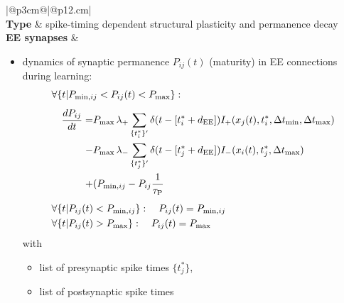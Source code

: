 \documentclass[10pt,a4paper,twoside,american]{article}
\newcommand{\EE}{{\exc\exc}}
\newcommand{\exc}{\textnormal{E}}     %
\begin{document}
\begin{table}[ht!]
  \small
  \begin{tabular}{|@{\hspace*{1mm}}p{3cm}@{}|@{\hspace*{1mm}}p{}|}
  \hline 
  \\
  \hline
  \textbf{Type} & spike-timing dependent structural plasticity and permanence decay \\
  \hline
  \textbf{EE synapses} &
      \begin{itemize}  
        \item dynamics of synaptic permanence $P_{ij}(t)$ (maturity) in EE connections during learning:
          \begin{equation}
            \label{eq:plasticity}
            \begin{aligned}
              &\forall \{t|P_{\text{min},ij}<P_{ij}(t)<P_\text{max}\}: \\[1ex]
              &\begin{aligned}
                \quad \frac{dP_{ij}}{dt} = &P_\text{max} \, \lambda_{+} \sum_{\{t_i^*\}^\prime} \delta(t-[t_i^*+d_\EE]) I_{+}(x_j(t), t_i^*,\Delta{}t_\text{min},\Delta{}t_\text{max}) \\
                - &P_\text{max} \, \lambda_{-} \sum_{\{t_j^*\}^\prime} \delta(t-[t_j^*+d_\EE]) I_{-}(x_i(t),t_j^*,\Delta{}t_\text{max}) \\
                + &(P_{\text{min},ij}-P_{ij} \frac{1}{\tau_\text{P}}
              \end{aligned} \\[1ex]
              &\forall \{t|P_{ij}(t)<P_{\text{min},ij}\}: \quad P_{ij}(t)=P_{\text{min},ij}\\
              &\forall \{t|P_{ij}(t)>P_\text{max}\}: \quad P_{ij}(t)=P_\text{max}
            \end{aligned}
        \end{equation}
        with
        \begin{itemize}
        \item list of presynaptic spike times $\{t_j^*\}$,
        \item list of postsynaptic spike times %

\end{itemize}
\end{itemize}
\end{tabular}
\end{table}
\end{document}
